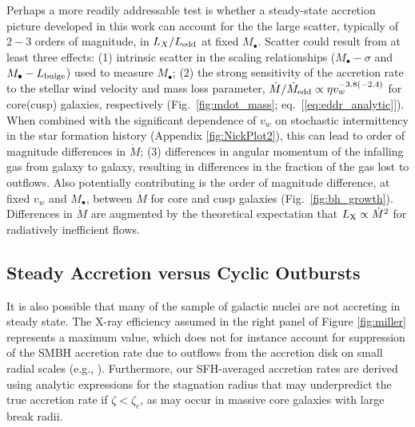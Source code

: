 \documentclass[usenatbib,fleqn]{mn2e}
\newcommand{\Mbh}[1][]{M_{\bullet#1}}
\begin{document}
  Perhaps a more readily addressable test is whether a steady-state
  accretion picture developed in this work can account for the the
  large scatter, typically of $2-3$ orders of magnitude, in
  $L_{X}/L_{\rm edd}$ at fixed $M_{\bullet}$.  Scatter could result
  from at least three effects: (1) intrinsic scatter in the scaling
  relationships ($\Mbh-\sigma$ and $\Mbh-L_{\rm bulge}$) used to
  measure $\Mbh$; (2) the strong sensitivity of the accretion rate to
  the stellar wind velocity and mass loss parameter,
  $\dot{M}/\dot{M}_{\rm edd} \propto \eta v_{w}^{-3.8(-2.4)}$ for
  core(cusp) galaxies, respectively (Fig.~\ref{fig:mdot_mass};
  eq.~[\ref{eq:eddr_analytic}]).  When combined with the significant
  dependence of $v_w$ on stochastic intermittency in the star
  formation history (Appendix \ref{fig:NickPlot2}), this can lead to
  order of magnitude differences in $\dot{M}$; (3) differences in angular
  momentum of the infalling gas from galaxy to galaxy, resulting in
  differences in the fraction of the gas lost to outflows.
  Also potentially contributing is the order of magnitude difference,
  at fixed $v_w$ and $M_{\bullet}$, between $\dot{M}$ for core and
  cusp galaxies (Fig.~\ref{fig:bh_growth}).  Differences in $\dot{M}$
  are augmented by the theoretical expectation that $L_{\rm X} \propto \dot{M}^{2}
  $ for radiatively inefficient flows.





\subsection{Steady Accretion versus Cyclic Outbursts}
\label{sec:cycle}

It is also possible that many of the \citet{Miller+15} sample of
galactic nuclei are not accreting in steady state.  The 
X-ray efficiency assumed in the right panel of Figure \ref{fig:miller}
represents a maximum value, which does not for instance account for
suppression of the SMBH accretion rate due to outflows from the
accretion disk on small radial scales (e.g.,
\citealt{Blandford&Begelman99}).  Furthermore, our SFH-averaged
accretion rates are derived using analytic expressions for the
stagnation radius that may underpredict the true accretion rate if
$\zeta < \zeta_c$, as may occur in massive core galaxies with large
break radii.  
\end{document}
